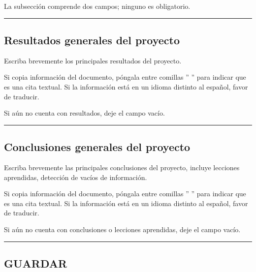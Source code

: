 \documentclass[
]{book}
\begin{document}
La subsección comprende dos campos; ninguno es obligatorio.

\begin{center}\rule{0.5\linewidth}{0.5pt}\end{center}

\hypertarget{resultados-generales-del-proyecto}{%
\subsection*{Resultados generales del proyecto}\label{resultados-generales-del-proyecto}}

Escriba brevemente los principales resultados del proyecto.

Si copia información del documento, póngala entre comillas '' '' para indicar que es una cita textual. Si la información está en un idioma distinto al español, favor de traducir.

Si aún no cuenta con resultados, deje el campo vacío.

\begin{center}\rule{0.5\linewidth}{0.5pt}\end{center}

\hypertarget{conclusiones-generales-del-proyecto}{%
\subsection*{Conclusiones generales del proyecto}\label{conclusiones-generales-del-proyecto}}

Escriba brevemente las principales conclusiones del proyecto, incluye lecciones aprendidas, detección de vacíos de información.

Si copia información del documento, póngala entre comillas '' '' para indicar que es una cita textual. Si la información está en un idioma distinto al español, favor de traducir.

Si aún no cuenta con conclusiones o lecciones aprendidas, deje el campo vacío.

\begin{center}\rule{0.5\linewidth}{0.5pt}\end{center}

\hypertarget{guardar-8}{%
\subsection*{GUARDAR}\label{guardar-8}}
\end{document}
